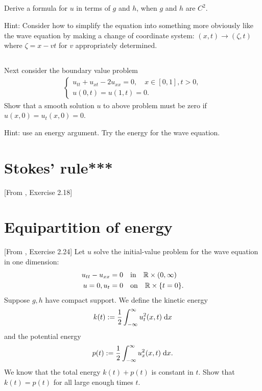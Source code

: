 \documentclass[11pt,letterpaper]{report}
\begin{document}
\subsection{}
Derive a formula for $u$ in terms of $g$ and $h$, when $g$ and $h$ are $C^2$. 

Hint: Consider how to simplify the equation into something more obviously like the wave equation
by making a change of coordinate system: $(x,t)\to (\zeta,t)$ where $\zeta = x-vt$ for $v$ appropriately determined. 

\subsection{}
Next consider the boundary value problem 
\begin{align}
    \begin{cases}
        u_{tt}+u_{xt}-2u_{xx} = 0,\quad x\in[0,1], t>0,\\
        u(0,t) = u(1,t) = 0.
    \end{cases}
\end{align}
Show that a smooth solution $u$ to above problem must be zero if $u(x,0)=u_t(x,0)=0$. 

Hint: use an energy argument. Try the energy for the wave equation. 

\section{Stokes' rule***}
[From \cite{Evans_10}, Exercise 2.18]

\section{Equipartition of energy}
[From \cite{Evans_10}, Exercise 2.24] Let $u$ solve the initial-value problem for the wave equation in one dimension:
\begin{align}
    u_{tt}-u_{xx} = 0 &\quad \mbox{in} \quad \mathbb{R}\times(0,\infty)\\
    u=0, u_t=0 &\quad \mbox{on} \quad \mathbb{R}\times\{t=0\}.
\end{align}
Suppose $g,h$ have compact support. We define the kinetic energy
\begin{align}
    k(t):= \frac{1}{2}\int_{-\infty}^\infty u_t^2(x,t)\;\mathrm{d} x
\end{align}
and the potential energy
\begin{align}
    p(t):= \frac{1}{2}\int_{-\infty}^\infty u_x^2(x,t)\;\mathrm{d} x.
\end{align}
We know that the total energy $k(t)+p(t)$ is constant in $t$. Show that $k(t)=p(t)$ for all large enough times $t$. 
\end{document}
